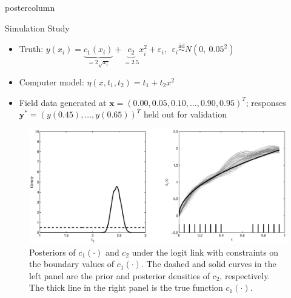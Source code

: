 \documentclass[final,10pt]{beamer}  %
\begin{document}
\begin{frame}{}
\begin{columns}[t]
\begin{column}{.33\textwidth}
\begin{beamercolorbox}[center,wd=1.475\textwidth]{postercolumn}
\begin{minipage}[T]{\textwidth}
{        \begin{block}{Simulation Study}
        {\small
            \begin{itemize}\itemsep2ex

                \item
                Truth: $y(x_i) = \underbrace{c_1(x_i)}_{= 2\sqrt{x_i}} + \underbrace{c_2}_{= 2.5}x_i^2 + \varepsilon_i, ~~\varepsilon_i \stackrel{\text{iid}}{\sim}N(0, ~0.05^2)$

                \item
                Computer model: $\eta(x, t_1, t_2) = t_1 + t_2 x^2$

                \item
                Field data generated at $\mathbf{x} = (0.00, 0.05, 0.10, \ldots, 0.90, 0.95)^T$; responses $\mathbf{y}^{\ast} = (y(0.45), \ldots, y(0.65))^T$ held out for validation

            \end{itemize}
%
            \begin{figure}[tb]
            \centering
            \includegraphics[scale= 0.5, clip= TRUE, trim= 0.5in 0pt 0in 0in]{strongTauPostPlots_2_Logit.eps}  %
            \caption{{\small Posteriors of $c_1(\cdot)$ and $c_2$ under the logit link with constraints on the boundary values of $c_1(\cdot)$. The dashed and solid curves in the left panel are the prior and posterior densities of $c_2$, respectively. The thick line in the right panel is the true function $c_1(\cdot)$.}}%
        \end{figure}

}
\end{block}}
\end{minipage}
\end{beamercolorbox}
\end{column}
\end{columns}
\end{frame}
\end{document}
